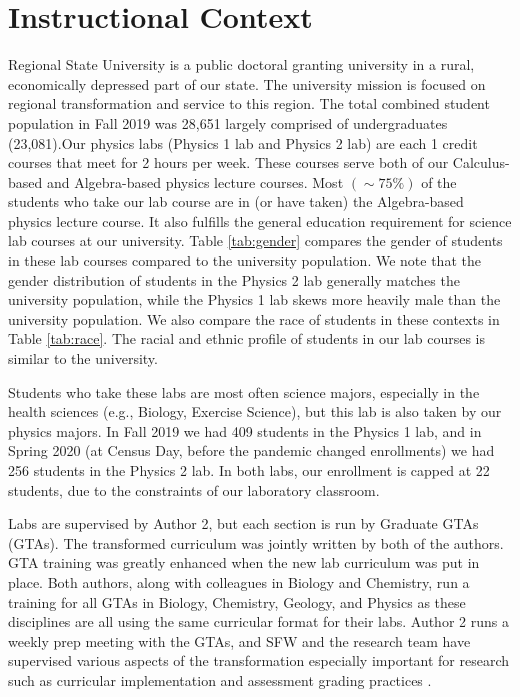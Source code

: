 \documentclass[aip, numerical, preprint]{revtex4-2}
\begin{document}
\section{Instructional Context}

Regional State University is a public doctoral granting university in a rural, economically
depressed part of our state.  The university mission is focused on regional transformation and
service to this region.  The total combined student population in Fall 2019 was 28,651 largely
comprised of undergraduates (23,081).Our physics labs (Physics 1 lab and Physics 2 lab) are
each 1 credit courses that meet for 2 hours per week. These courses serve both of our
Calculus-based and Algebra-based physics lecture courses.  Most $(\sim 75\%)$ of the students
who take our lab course are in (or have taken) the Algebra-based physics lecture course. It
also fulfills the general education requirement for science lab courses at our university.
Table \ref{tab:gender} compares the gender of students in these lab courses compared to the
university population.  We note that the gender distribution of students in the Physics 2 lab
generally matches the university population, while the Physics 1 lab skews more heavily male
than the university population.  We also compare the race of students in these contexts in
Table \ref{tab:race}.  The racial and ethnic profile of students in our lab courses is similar
to the university.

Students who take these labs are most often science majors, especially in the health sciences
(e.g., Biology, Exercise Science), but this lab is also taken by our physics majors.  In Fall
2019 we had 409 students in the Physics 1 lab, and in Spring 2020 (at Census Day, before the
pandemic changed enrollments) we had 256 students in the Physics 2 lab.  In both labs, our
enrollment is capped at 22 students, due to the constraints of our laboratory classroom.

Labs are supervised by Author 2, but each section is run by Graduate GTAs (GTAs). The
transformed curriculum was jointly written by both of the authors.  GTA training was greatly
enhanced when the new lab curriculum was put in place.  Both authors, along with colleagues in
Biology and Chemistry, run a training for all GTAs in Biology, Chemistry, Geology, and Physics
as these disciplines are all using the same curricular format for their labs.  Author 2 runs a
weekly prep meeting with the GTAs, and SFW and the research team have supervised various
aspects of the transformation especially important for research such as curricular
implementation \citep{SmithJoyner2020} and assessment grading practices \citep{Wolf2019}.
\end{document}
